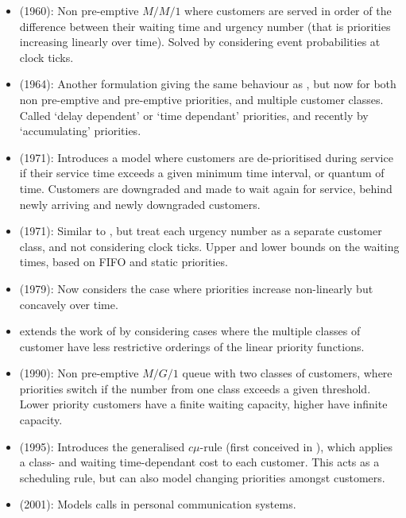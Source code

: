 \documentclass{article}
\begin{document}
\begin{itemize}
  \item \cite{jackson60} (1960): Non pre-emptive $M/M/1$ where customers
      are served in order of the difference between their waiting time
        and urgency number (that is priorities increasing linearly over
        time). Solved by considering event probabilities at clock ticks.
  \item \cite{kleinrock164} (1964): Another formulation giving the same
      behaviour as \cite{jackson60}, but now for both non pre-emptive and
        pre-emptive priorities, and multiple customer classes. Called `delay
        dependent' or `time dependant' priorities, and recently by
        `accumulating' priorities.
  \item \cite{adiri71} (1971): Introduces a model where customers are
      de-prioritised during service if their service time exceeds a given
        minimum time interval, or quantum of time. Customers are downgraded and
        made to wait again for service, behind newly arriving and newly
        downgraded customers.
  \item \cite{holtzman71} (1971): Similar to \cite{jackson60}, but treat each
      urgency number as a separate customer class, and not considering
        clock ticks. Upper and lower bounds on the waiting times, based
        on FIFO and static priorities.
  \item \cite{netterman79} (1979): Now considers the case where
      priorities increase non-linearly but concavely over time.
  \item \cite{bagchisullivan85} extends the work of
      \cite{jackson60, kleinrock164, holtzman71} by considering cases where the
        multiple classes of customer have less restrictive orderings of the
        linear priority functions.
  \item \cite{fratini90} (1990): Non pre-emptive $M/G/1$ queue with two
      classes of customers, where priorities switch if the number from
        one class exceeds a given threshold. Lower priority customers
        have a finite waiting capacity, higher have infinite capacity.
  \item \cite{vanmieghan95} (1995): Introduces the generalised $c\mu$-rule
    (first conceived in \cite{smith56}), which applies a class- and waiting
      time-dependant cost to each customer. This acts as a scheduling rule,
      but can also model changing priorities amongst customers.
  \item \cite{xhafa01} (2001): Models calls in personal communication systems.

\end{itemize}
\end{document}
